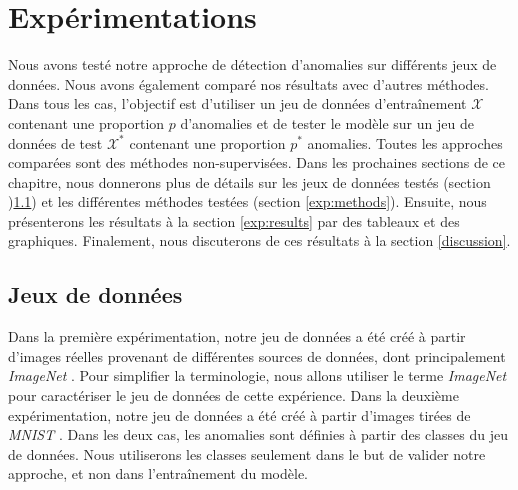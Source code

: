 \chapter{Expérimentations}     %
\label{chap:experiments}                   %

Nous avons testé notre approche de détection d'anomalies sur différents jeux de données. Nous avons également comparé nos résultats avec d'autres méthodes. Dans tous les cas, l'objectif est d'utiliser un jeu de données d'entraînement $\mathcal{X}$ contenant une proportion $p$ d'anomalies et de tester le modèle sur un jeu de données de test $\mathcal{X^*}$ contenant une proportion $p^*$ anomalies. Toutes les approches comparées sont des méthodes non-supervisées. Dans les prochaines sections de ce chapitre, nous donnerons plus de détails sur les jeux de données testés (section )\ref{exp:datasets}) et les différentes méthodes testées (section \ref{exp:methods}). Ensuite, nous présenterons les résultats à la section \ref{exp:results} par des tableaux et des graphiques. Finalement, nous discuterons de ces résultats à la section \ref{discussion}.

\section{Jeux de données} \label{exp:datasets}

Dans la première expérimentation, notre jeu de données a été créé à partir d'images réelles provenant de différentes sources de données, dont principalement \textit{ImageNet} \citep{deng2009imagenet}. Pour simplifier la terminologie, nous allons utiliser le terme \textit{ImageNet} pour caractériser le jeu de données de cette expérience. Dans la deuxième expérimentation, notre jeu de données a été créé à partir d'images tirées de \textit{MNIST} \citep{lecun2010mnist}. Dans les deux cas, les anomalies sont définies à partir des classes du jeu de données. Nous utiliserons les classes seulement dans le but de valider notre approche, et non dans l'entraînement du modèle.

